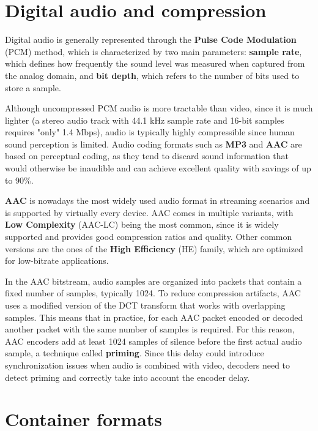\section{Digital audio and compression}
\label{sec:bg/audio}

Digital audio is generally represented through the \textbf{Pulse Code Modulation} (PCM) method, which is characterized by two main parameters: \textbf{sample rate}, which defines how frequently the sound level was measured when captured from the analog domain, and \textbf{bit depth}, which refers to the number of bits used to store a sample.

Although uncompressed PCM audio is more tractable than video, since it is much lighter (a stereo audio track with 44.1 kHz sample rate and 16-bit samples requires "only" 1.4 Mbps), audio is typically highly compressible since human sound perception is limited. Audio coding formats such as \textbf{MP3} and \textbf{AAC} are based on perceptual coding, as they tend to discard sound information that would otherwise be inaudible and can achieve excellent quality with savings of up to 90\%.\cite{aac}

\textbf{AAC} is nowadays the most widely used audio format in streaming scenarios and is supported by virtually every device.\cite{bitmovin} AAC comes in multiple variants, with \textbf{Low Complexity} (AAC-LC) being the most common, since it is widely supported and provides good compression ratios and quality. Other common versions are the ones of the \textbf{High Efficiency} (HE) family, which are optimized for low-bitrate applications.

In the AAC bitstream, audio samples are organized into packets that contain a fixed number of samples, typically 1024. To reduce compression artifacts, AAC uses a modified version of the DCT transform that works with overlapping samples. This means that in practice, for each AAC packet encoded or decoded another packet with the same number of samples is required. For this reason, AAC encoders add at least 1024 samples of silence before the first actual audio sample, a technique called \textbf{priming}. Since this delay could introduce synchronization issues when audio is combined with video, decoders need to detect priming and correctly take into account the encoder delay.\cite{aacpriming}

\section{Container formats}
\label{sec:bg/containers}

